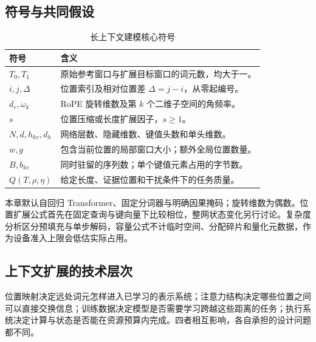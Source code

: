 \documentclass[../textbook.tex]{subfiles}
\begin{document}
\subsection{符号与共同假设}
\begin{table}[htbp]
\centering
\caption{长上下文建模核心符号}\label{tab:long-context-symbols}
\begin{tabularx}{\linewidth}{lX}
\toprule 符号 & 含义\\\midrule
$T_0,T_1$ & 原始参考窗口与扩展目标窗口的词元数，均大于一。\\
$i,j,\Delta$ & 位置索引及相对位置差 $\Delta=j-i$，从零起编号。\\
$d_r,\omega_k$ & RoPE 旋转维数及第 $k$ 个二维子空间的角频率。\\
$s$ & 位置压缩或长度扩展因子，$s\ge1$。\\
$N,d,h_{kv},d_h$ & 网络层数、隐藏维数、键值头数和单头维数。\\
$w,g$ & 包含当前位置的局部窗口大小；额外全局位置数量。\\
$B,b_{kv}$ & 同时驻留的序列数；单个键值元素占用的字节数。\\
$Q(T,\rho,\eta)$ & 给定长度、证据位置和干扰条件下的任务质量。\\
\bottomrule
\end{tabularx}
\end{table}

\begin{assumption}[长度分析的前提]
本章默认自回归 Transformer、固定分词器与明确因果掩码；旋转维数为偶数。位置扩展公式首先在固定查询与键向量下比较相位，整网状态变化另行讨论。复杂度分析区分预填充与单步解码，容量公式不计临时空间、分配碎片和量化元数据，作为设备准入上限会低估实际占用。
\end{assumption}

\subsection{上下文扩展的技术层次}
位置映射决定远处词元怎样进入已学习的表示系统；注意力结构决定哪些位置之间可以直接交换信息；训练数据决定模型是否需要学习跨越这些距离的任务；执行系统决定计算与状态是否能在资源预算内完成。四者相互影响，各自承担的设计问题都不同。
\end{document}
